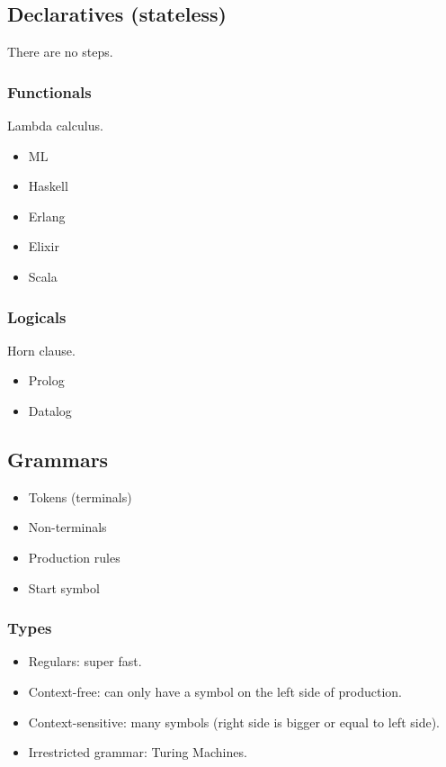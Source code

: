 \documentclass[11pt]{article}
\begin{document}
\subsection{Declaratives (stateless)}
\label{sec:org6b6a5b2}
There are no steps.
\subsubsection{Functionals}
\label{sec:org1445299}
Lambda calculus.
\begin{itemize}
\item ML
\item Haskell
\item Erlang
\item Elixir
\item Scala
\end{itemize}
\subsubsection{Logicals}
\label{sec:orgfa7c23d}
Horn clause.
\begin{itemize}
\item Prolog
\item Datalog
\end{itemize}
\subsection{Grammars}
\label{sec:org655f98b}
\begin{itemize}
\item Tokens (terminals)
\item Non-terminals
\item Production rules
\item Start symbol
\end{itemize}
\subsubsection{Types}
\label{sec:orgabb5297}
\begin{itemize}
\item Regulars: super fast.
\item Context-free: can only have a symbol on the left side of production.
\item Context-sensitive: many symbols (right side is bigger or equal to left side).
\item Irrestricted grammar: Turing Machines.
\end{itemize}
\end{document}
